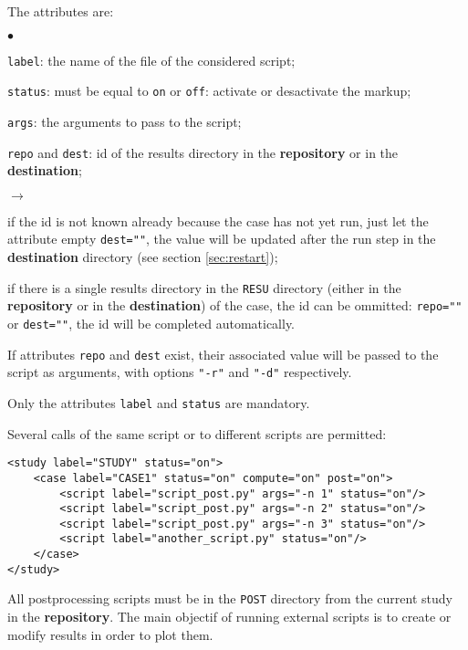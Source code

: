 \documentclass[a4paper,10pt,twoside]{csshortdoc}
\begin{document}
The attributes are:
\begin{list}{$\bullet$}{}
\item \texttt{label}: the name of the file of the considered script;
\item \texttt{status}: must be equal to \texttt{on} or \texttt{off}:
activate or desactivate the markup;
\item \texttt{args}: the arguments to pass to the script;
\item \texttt{repo} and \texttt{dest}: id of the results directory in the
\textbf{repository} or in the \textbf{destination};
\begin{list}{$\rightarrow$}{}
\item if the id is not known already because the case has not yet run, just let
the attribute empty \texttt{dest=""}, the value will be updated after the run
step in the \textbf{destination} directory (see section \ref{sec:restart});
\item if there is a single results directory in the \texttt{RESU} directory
(either in the \textbf{repository} or in the \textbf{destination}) of the case,
the id can be ommitted: \texttt{repo=""} or \texttt{dest=""}, the id will be
completed automatically.
\end{list}
If attributes \texttt{repo} and \texttt{dest} exist, their associated value
will be passed to the script as arguments, with options \texttt{"-r"} and
\texttt{"-d"} respectively.
\end{list}

Only the attributes \texttt{label} and \texttt{status} are mandatory.

Several calls of the same script or to different scripts are permitted:
\small
\begin{verbatim}
<study label="STUDY" status="on">
    <case label="CASE1" status="on" compute="on" post="on">
        <script label="script_post.py" args="-n 1" status="on"/>
        <script label="script_post.py" args="-n 2" status="on"/>
        <script label="script_post.py" args="-n 3" status="on"/>
        <script label="another_script.py" status="on"/>
    </case>
</study>
\end{verbatim}
\normalsize

All postprocessing scripts must be in the \texttt{POST} directory from
the current study in the \textbf{repository}.
The main objectif of running external scripts is to create or modify
results in order to plot them.
\end{document}
